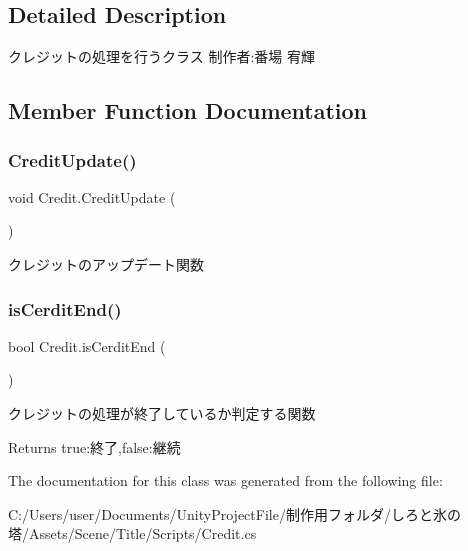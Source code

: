 \subsection{Detailed Description}
クレジットの処理を行うクラス 制作者\+:番場 宥輝 



\subsection{Member Function Documentation}
\mbox{\label{class_credit_a57de0ac73f0894b9e902ebb6e4953df9}} 
\subsubsection{\texorpdfstring{Credit\+Update()}{CreditUpdate()}}
{\footnotesize\ttfamily void Credit.\+Credit\+Update (\begin{DoxyParamCaption}{ }\end{DoxyParamCaption})\hspace{0.3cm}{\ttfamily [inline]}}



クレジットのアップデート関数 

\mbox{\label{class_credit_aa75f39f86feb5d591836c9f141fca52c}} 
\subsubsection{\texorpdfstring{is\+Cerdit\+End()}{isCerditEnd()}}
{\footnotesize\ttfamily bool Credit.\+is\+Cerdit\+End (\begin{DoxyParamCaption}{ }\end{DoxyParamCaption})\hspace{0.3cm}{\ttfamily [inline]}}



クレジットの処理が終了しているか判定する関数 

\begin{DoxyReturn}{Returns}
true\+:終了,false\+:継続
\end{DoxyReturn}


The documentation for this class was generated from the following file\+:\begin{DoxyCompactItemize}
\item 
C\+:/\+Users/user/\+Documents/\+Unity\+Project\+File/制作用フォルダ/しろと氷の塔/\+Assets/\+Scene/\+Title/\+Scripts/Credit.\+cs\end{DoxyCompactItemize}
